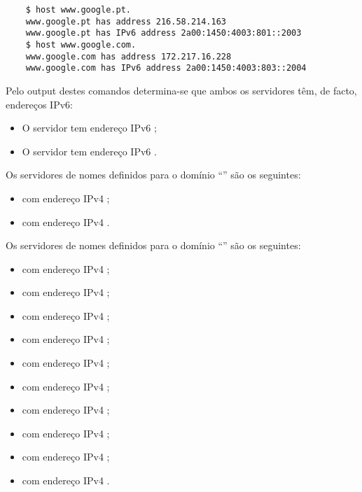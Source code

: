 \begin{verbatim}
    $ host www.google.pt.
    www.google.pt has address 216.58.214.163
    www.google.pt has IPv6 address 2a00:1450:4003:801::2003
    $ host www.google.com.
    www.google.com has address 172.217.16.228
    www.google.com has IPv6 address 2a00:1450:4003:803::2004
\end{verbatim}

Pelo output destes comandos determina-se que ambos os servidores têm, de facto, endereços IPv6:

\begin{itemize}
    \item O servidor  tem endereço IPv6 ;
    \item O servidor  tem endereço IPv6 .
\end{itemize}



\noindent Os servidores de nomes definidos para o domínio ``'' são os seguintes:

\begin{itemize}
    \item {} com endereço IPv4 ;
    \item {} com endereço IPv4 .
\end{itemize}

\noindent Os servidores de nomes definidos para o domínio ``'' são os seguintes:

\begin{itemize}
    \item {} com endereço IPv4 ;
    \item {} com endereço IPv4 ;
    \item {} com endereço IPv4 ;
    \item {} com endereço IPv4 ;
    \item {} com endereço IPv4 ;
    \item {} com endereço IPv4 ;
    \item {} com endereço IPv4 ;
    \item {} com endereço IPv4 ;
    \item {} com endereço IPv4 ;
    \item {} com endereço IPv4 .
\end{itemize}

